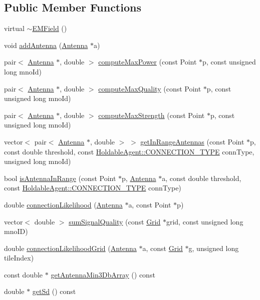 \subsection*{Public Member Functions}
\begin{DoxyCompactItemize}
\item 
virtual \hyperlink{class_e_m_field_abe7db07a27a120858107d5efa5f14edb}{$\sim$\+E\+M\+Field} ()
\item 
void \hyperlink{class_e_m_field_ac531ecbce4c81aa5da19fe3c734a585c}{add\+Antenna} (\hyperlink{class_antenna}{Antenna} $\ast$a)
\item 
pair$<$ \hyperlink{class_antenna}{Antenna} $\ast$, double $>$ \hyperlink{class_e_m_field_a01cfb9fea3dadfcfe5d6f00551193acd}{compute\+Max\+Power} (const Point $\ast$p, const unsigned long mno\+Id)
\item 
pair$<$ \hyperlink{class_antenna}{Antenna} $\ast$, double $>$ \hyperlink{class_e_m_field_ac866f6224e34895a0ee085c4baf43a01}{compute\+Max\+Quality} (const Point $\ast$p, const unsigned long mno\+Id)
\item 
pair$<$ \hyperlink{class_antenna}{Antenna} $\ast$, double $>$ \hyperlink{class_e_m_field_a9a3cdbca4fcf408ce58a30fb98de1bbb}{compute\+Max\+Strength} (const Point $\ast$p, const unsigned long mno\+Id)
\item 
vector$<$ pair$<$ \hyperlink{class_antenna}{Antenna} $\ast$, double $>$ $>$ \hyperlink{class_e_m_field_a2ad800417b06a62e68edd1fccb5c4b93}{get\+In\+Range\+Antennas} (const Point $\ast$p, const double threshold, const \hyperlink{class_holdable_agent_ae2c334b004d7b9c5a999cf2618e4e518}{Holdable\+Agent\+::\+C\+O\+N\+N\+E\+C\+T\+I\+O\+N\+\_\+\+T\+Y\+PE} conn\+Type, unsigned long mno\+Id)
\item 
bool \hyperlink{class_e_m_field_a5cd43aded41779d2d24de3f3e5c717d0}{is\+Antenna\+In\+Range} (const Point $\ast$p, \hyperlink{class_antenna}{Antenna} $\ast$a, const double threshold, const \hyperlink{class_holdable_agent_ae2c334b004d7b9c5a999cf2618e4e518}{Holdable\+Agent\+::\+C\+O\+N\+N\+E\+C\+T\+I\+O\+N\+\_\+\+T\+Y\+PE} conn\+Type)
\item 
double \hyperlink{class_e_m_field_a710da64db53718cdeed7b8c8dc11bba3}{connection\+Likelihood} (\hyperlink{class_antenna}{Antenna} $\ast$a, const Point $\ast$p)
\item 
vector$<$ double $>$ \hyperlink{class_e_m_field_a4995bf4b93c09f12b7aab64c7eb24603}{sum\+Signal\+Quality} (const \hyperlink{class_grid}{Grid} $\ast$grid, const unsigned long mno\+ID)
\item 
double \hyperlink{class_e_m_field_a533effeee35a80746ea7e3ddc5998e48}{connection\+Likelihood\+Grid} (\hyperlink{class_antenna}{Antenna} $\ast$a, const \hyperlink{class_grid}{Grid} $\ast$g, unsigned long tile\+Index)
\item 
const double $\ast$ \hyperlink{class_e_m_field_ab2132484b9c52f2224bc81f354b24df6}{get\+Antenna\+Min3\+Db\+Array} () const
\item 
double $\ast$ \hyperlink{class_e_m_field_a0fea003948a67df01174480480376169}{get\+Sd} () const
\end{DoxyCompactItemize}
